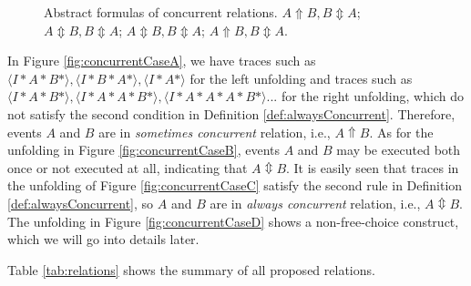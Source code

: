 \documentclass{llncs}
\begin{document}
\begin{figure}[htbp]
{\begin{minipage}[b]{0.3\textwidth}
	\end{minipage}
	\label{fig:concurrentCaseC}
}
\caption{Abstract formulas of concurrent relations.  $A\Uparrow B,B\Updownarrow A$;  $A\Updownarrow B,B\Updownarrow A$;  $A\Updownarrow B,B\Updownarrow A$;  $A\Uparrow B,B\Updownarrow A$.\label{fig:concurrentCases}}
\end{figure}

In Figure \ref{fig:concurrentCaseA}, we have traces such as $\langle I*A*B*\rangle ,\langle I*B*A*\rangle ,\langle I*A*\rangle $ for the left unfolding and traces such as $\langle I*A*B*\rangle ,\langle I*A*A*B*\rangle ,\langle I*A*A*A*B*\rangle ...$ for the right unfolding, which do not satisfy the second condition in Definition \ref{def:alwaysConcurrent}. Therefore, events $A$ and $B$ are in \textit{sometimes concurrent} relation, i.e., $A\Uparrow B$. As for the unfolding in Figure \ref{fig:concurrentCaseB}, events $A$ and $B$ may be executed both once or not executed at all, indicating that $A\Updownarrow B$. It is easily seen that traces in the unfolding of Figure \ref{fig:concurrentCaseC} satisfy the second rule in Definition \ref{def:alwaysConcurrent}, so $A$ and $B$ are in \textit{always concurrent} relation, i.e., $A\Updownarrow B$. The unfolding in Figure \ref{fig:concurrentCaseD} shows a non-free-choice construct, which we will go into details later.

Table \ref{tab:relations} shows the summary of all proposed relations.
\end{document}

